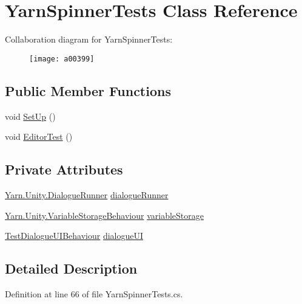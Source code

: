 \hypertarget{a00188}{\section{Yarn\-Spinner\-Tests Class Reference}
\label{a00188}
}


Collaboration diagram for Yarn\-Spinner\-Tests\-:
\nopagebreak
\begin{figure}[H]
\begin{center}
\leavevmode
\texttt{[image: a00399]}
\end{center}
\end{figure}
\subsection*{Public Member Functions}
\begin{DoxyCompactItemize}
\item 
void \hyperlink{a00188_ad6e4c6a92bb5ed6187949264df6aaf1b}{Set\-Up} ()
\item 
void \hyperlink{a00188_a60ab8ed8dc30ec30e74baa1916d47324}{Editor\-Test} ()
\end{DoxyCompactItemize}
\subsection*{Private Attributes}
\begin{DoxyCompactItemize}
\item 
\hyperlink{a00083}{Yarn.\-Unity.\-Dialogue\-Runner} \hyperlink{a00188_a9791840e0b5987e5bd09bce83ce2d8d9}{dialogue\-Runner}
\item 
\hyperlink{a00181}{Yarn.\-Unity.\-Variable\-Storage\-Behaviour} \hyperlink{a00188_a27dbc8c3f7f23ce142d1d5d1fd3df8bc}{variable\-Storage}
\item 
\hyperlink{a00161}{Test\-Dialogue\-U\-I\-Behaviour} \hyperlink{a00188_aace025d2a9a703154a1989c47b0a0737}{dialogue\-U\-I}
\end{DoxyCompactItemize}


\subsection{Detailed Description}


Definition at line 66 of file Yarn\-Spinner\-Tests.\-cs.



